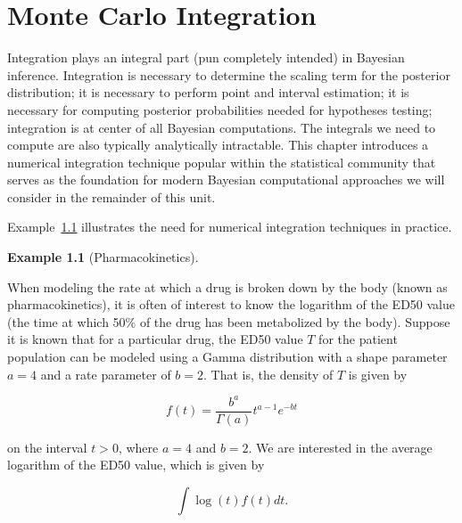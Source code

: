 \documentclass[
  letterpaper,
  DIV=11,
  numbers=noendperiod]{scrreprt}
\theoremstyle{definition}
\theoremstyle{plain}
\theoremstyle{definition}
\newtheorem{example}{Example}[chapter]
\theoremstyle{remark}
\begin{document}
\hypertarget{sec-mc-integration}{%
\chapter{Monte Carlo Integration}\label{sec-mc-integration}}

\providecommand{\norm}[1]{\lVert#1\rVert}
\providecommand{\abs}[1]{\lvert#1\rvert}
\providecommand{\iid}{\stackrel{\text{IID}}{\sim}}
\providecommand{\ind}{\stackrel{\text{Ind}}{\sim}}

\providecommand{\bm}[1]{\mathbf{#1}}
\providecommand{\bs}[1]{\boldsymbol{#1}}
\providecommand{\bbeta}{\bs{\beta}}

\providecommand{\Ell}{\mathcal{L}}
\providecommand{\indep}{\perp\negthickspace\negmedspace\perp}

Integration plays an integral part (pun completely intended) in Bayesian
inference. Integration is necessary to determine the scaling term for
the posterior distribution; it is necessary to perform point and
interval estimation; it is necessary for computing posterior
probabilities needed for hypotheses testing; integration is at center of
all Bayesian computations. The integrals we need to compute are also
typically analytically intractable. This chapter introduces a numerical
integration technique popular within the statistical community that
serves as the foundation for modern Bayesian computational approaches we
will consider in the remainder of this unit.

Example~\ref{exm-integration} illustrates the need for numerical
integration techniques in practice.

\begin{example}[Pharmacokinetics]\protect\hypertarget{exm-integration}{}\label{exm-integration}

When modeling the rate at which a drug is broken down by the body (known
as pharmacokinetics), it is often of interest to know the logarithm of
the ED50 value (the time at which 50\% of the drug has been metabolized
by the body). Suppose it is known that for a particular drug, the ED50
value \(T\) for the patient population can be modeled using a Gamma
distribution with a shape parameter \(a = 4\) and a rate parameter of
\(b = 2\). That is, the density of \(T\) is given by

\[f(t) = \frac{b^a}{\Gamma(a)} t^{a-1} e^{-bt}\]

on the interval \(t > 0\), where \(a = 4\) and \(b = 2\). We are
interested in the average logarithm of the ED50 value, which is given by

\[\int \log(t) f(t) dt.\]

\end{example}
\end{document}
